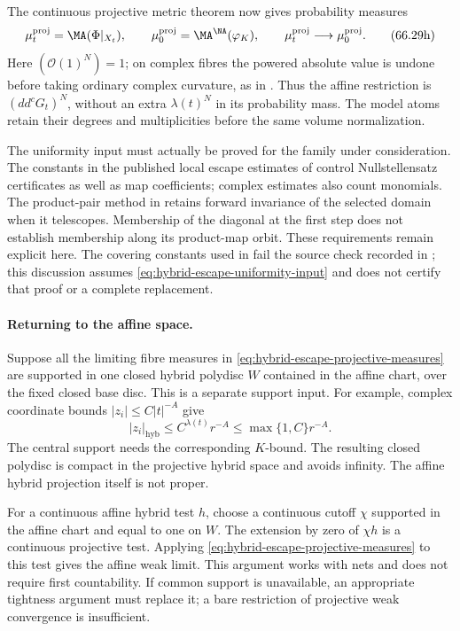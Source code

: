 The continuous projective metric theorem
 now gives probability measures
\[
 \mu_t^{\mathrm{proj}}=\MA(\Phi|_{X_t}),\qquad
 \mu_0^{\mathrm{proj}}=\MA^{\NA}(\varphi_K),\qquad
 \mu_t^{\mathrm{proj}}\longrightarrow\mu_0^{\mathrm{proj}}.
\tag{66.29h}\label{eq:hybrid-escape-projective-measures}
\]
Here $(\mathcal O(1)^N)=1$; on complex fibres the powered absolute
value is undone before taking ordinary complex curvature, as in
. Thus the affine restriction is
$(dd^cG_t)^N$, without an extra $\lambda(t)^N$ in its probability
mass. The model atoms retain their degrees and multiplicities before
the same volume normalization.

The uniformity input must actually be proved for the family under
consideration. The constants in the published local escape estimates
of \cite{Kawaguchi13RegularPublished} control Nullstellensatz
certificates as well as map coefficients; complex estimates also
count monomials. The product-pair method in
\cite{Lee12RegularPairV2} retains forward invariance of the selected
domain when it telescopes. Membership of the diagonal at the first
step does not establish membership along its product-map orbit.
These requirements remain explicit here. The covering constants
used in \cite[Proposition~5.2]{Irokawa26RegularV1} fail the source
check recorded in ; this
discussion assumes \eqref{eq:hybrid-escape-uniformity-input} and
does not certify that proof or a complete replacement.

\paragraph{Returning to the affine space.}
Suppose all the limiting fibre measures in
\eqref{eq:hybrid-escape-projective-measures} are supported in one
closed hybrid polydisc $W$ contained in the affine chart, over the
fixed closed base disc. This is a separate support input. For example,
complex coordinate bounds $|z_i|\leq C|t|^{-A}$ give
\[
 |z_i|_{\mathrm{hyb}}
       \leq C^{\lambda(t)}r^{-A}
       \leq\max\{1,C\}r^{-A}.
\tag{66.29i}\label{eq:hybrid-escape-support-bound}
\]
The central support needs the corresponding $K$-bound. The resulting
closed polydisc is compact in the projective hybrid space and avoids
infinity. The affine hybrid projection itself is not proper.

For a continuous affine hybrid test $h$, choose a continuous cutoff
$\chi$ supported in the affine chart and equal to one on $W$.
The extension by zero of $\chi h$ is a continuous projective test.
Applying \eqref{eq:hybrid-escape-projective-measures} to this test
gives the affine weak limit. This argument works with nets and does
not require first countability. If common support is unavailable,
an appropriate tightness argument must replace it; a bare restriction
of projective weak convergence is insufficient.

